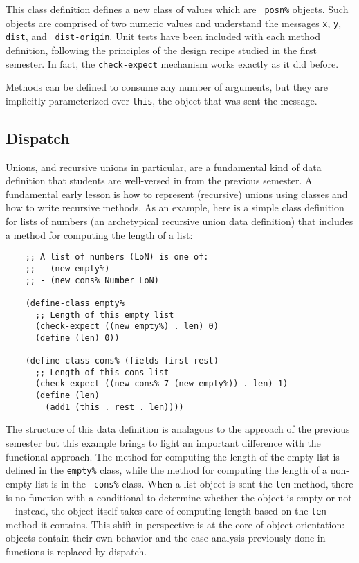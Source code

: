 \documentclass[submission,copyright]{eptcs}
\begin{document}
This class definition defines a new class of values which are {\tt
  posn\%} objects.  Such objects are comprised of two numeric values
and understand the messages {\tt x}, {\tt y}, {\tt dist}, and {\tt
  dist-origin}.  Unit tests have been included with each method
definition, following the principles of the design recipe studied in
the first semester.  In fact, the {\tt check-expect} mechanism works
exactly as it did before.

Methods can be defined to consume any number of arguments, but they
are implicitly parameterized over {\tt this}, the object that was sent
the message.

\subsection{Dispatch}

Unions, and recursive unions in particular, are a fundamental kind of
data definition that students are well-versed in from the previous
semester.  A fundamental early lesson is how to represent (recursive)
unions using classes and how to write recursive methods.  As an
example, here is a simple class definition for lists of numbers
(an archetypical recursive union data definition) that includes
a method for computing the length of a list:
\begin{verbatim}
    ;; A list of numbers (LoN) is one of:
    ;; - (new empty%)
    ;; - (new cons% Number LoN)

    (define-class empty%
      ;; Length of this empty list
      (check-expect ((new empty%) . len) 0)
      (define (len) 0))

    (define-class cons% (fields first rest)
      ;; Length of this cons list
      (check-expect ((new cons% 7 (new empty%)) . len) 1)
      (define (len)
        (add1 (this . rest . len))))
\end{verbatim}

The structure of this data definition is analagous to the approach of
the previous semester but this example brings to light an important
difference with the functional approach.  The method for computing the
length of the empty list is defined in the {\tt empty\%} class, while
the method for computing the length of a non-empty list is in the {\tt
  cons\%} class.  When a list object is sent the {\tt len} method,
there is no function with a conditional to determine whether the
object is empty or not---instead, the object itself takes care of
computing length based on the {\tt len} method it contains.  This
shift in perspective is at the core of object-orientation: objects
contain their own behavior and the case analysis previously done in
functions is replaced by dispatch.
\end{document}

